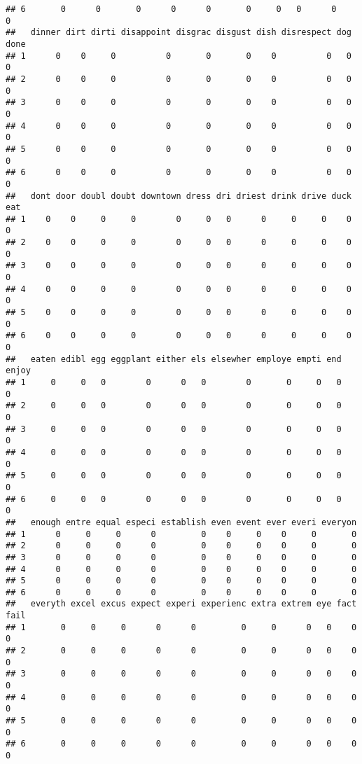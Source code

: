 \documentclass[]{article}
\begin{document}
\begin{verbatim}
## 6       0      0       0      0      0       0     0   0      0    0
##   dinner dirt dirti disappoint disgrac disgust dish disrespect dog done
## 1      0    0     0          0       0       0    0          0   0    0
## 2      0    0     0          0       0       0    0          0   0    0
## 3      0    0     0          0       0       0    0          0   0    0
## 4      0    0     0          0       0       0    0          0   0    0
## 5      0    0     0          0       0       0    0          0   0    0
## 6      0    0     0          0       0       0    0          0   0    0
##   dont door doubl doubt downtown dress dri driest drink drive duck eat
## 1    0    0     0     0        0     0   0      0     0     0    0   0
## 2    0    0     0     0        0     0   0      0     0     0    0   0
## 3    0    0     0     0        0     0   0      0     0     0    0   0
## 4    0    0     0     0        0     0   0      0     0     0    0   0
## 5    0    0     0     0        0     0   0      0     0     0    0   0
## 6    0    0     0     0        0     0   0      0     0     0    0   0
##   eaten edibl egg eggplant either els elsewher employe empti end enjoy
## 1     0     0   0        0      0   0        0       0     0   0     0
## 2     0     0   0        0      0   0        0       0     0   0     0
## 3     0     0   0        0      0   0        0       0     0   0     0
## 4     0     0   0        0      0   0        0       0     0   0     0
## 5     0     0   0        0      0   0        0       0     0   0     0
## 6     0     0   0        0      0   0        0       0     0   0     0
##   enough entre equal especi establish even event ever everi everyon
## 1      0     0     0      0         0    0     0    0     0       0
## 2      0     0     0      0         0    0     0    0     0       0
## 3      0     0     0      0         0    0     0    0     0       0
## 4      0     0     0      0         0    0     0    0     0       0
## 5      0     0     0      0         0    0     0    0     0       0
## 6      0     0     0      0         0    0     0    0     0       0
##   everyth excel excus expect experi experienc extra extrem eye fact fail
## 1       0     0     0      0      0         0     0      0   0    0    0
## 2       0     0     0      0      0         0     0      0   0    0    0
## 3       0     0     0      0      0         0     0      0   0    0    0
## 4       0     0     0      0      0         0     0      0   0    0    0
## 5       0     0     0      0      0         0     0      0   0    0    0
## 6       0     0     0      0      0         0     0      0   0    0    0

\end{verbatim}
\end{document}

